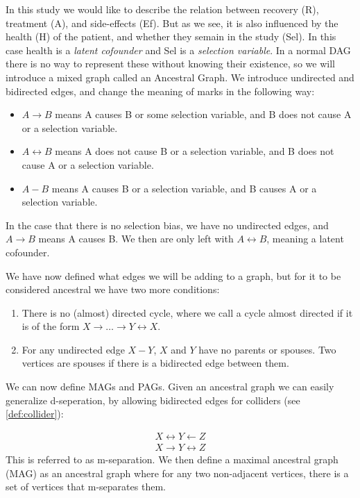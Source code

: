 \documentclass[11pt,a4paper]{report}
\theoremstyle{definition}
\begin{document}
In this study we would like to describe the relation between recovery (R),
treatment (A), and side-effects (Ef). But as we see, it is also influenced
by the health (H) of the patient, and whether they semain in the study
(Sel). In this case health is a \emph{latent cofounder} and Sel is a
\emph{selection variable}. In a normal DAG there is no way to represent
these without knowing their existence, so we will introduce a mixed graph
called an Ancestral Graph. We introduce undirected and bidirected edges,
and change the meaning of marks in the following way:

\begin{itemize}
  \item $A \rightarrow B$ means A causes B or some selection variable, and B
    does not cause A or a selection variable.

  \item $A \leftrightarrow B$ means A does not cause B or a selection
    variable, and B does not cause A or a selection variable.

  \item $A - B$ means A causes B or a selection variable, and B causes A
    or a selection variable.
\end{itemize}

In the case that there is no selection bias, we have no undirected edges,
and $A \rightarrow B$ means A causes B. We then are only left with $A
\leftrightarrow B$, meaning a latent cofounder.

We have now defined what edges we will be adding to a graph, but for it to
be considered ancestral we have two more conditions:

\begin{enumerate}
  \item There is no (almost) directed cycle, where we call a cycle almost
    directed if it is of the form $X \rightarrow \ldots \rightarrow Y
    \leftrightarrow X$.

  \item For any undirected edge $X - Y$, $X$ and $Y$ have no parents or
    spouses. Two vertices are spouses if there is a bidirected edge
    between them.
\end{enumerate}

We can now define MAGs and PAGs. Given an ancestral graph we can easily
generalize d-seperation, by allowing bidirected edges for colliders (see
\ref{def:collider}):

\begin{align*}
  X \leftrightarrow Y \leftarrow Z \\
  X \rightarrow Y \leftrightarrow Z
\end{align*}
This is referred to as m-separation. We then define a maximal ancestral
graph (MAG) as an ancestral graph where for any two non-adjacent vertices,
there is a set of vertices that m-separates them.
\end{document}
